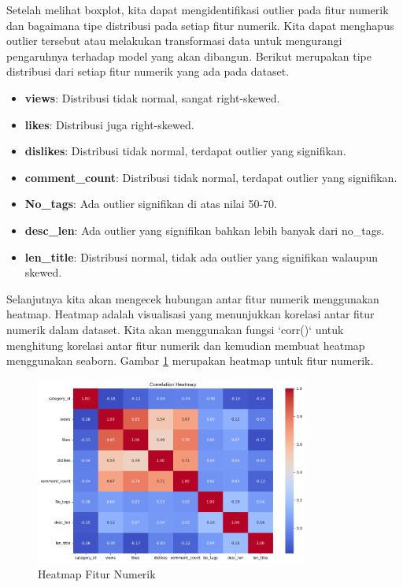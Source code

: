 Setelah melihat boxplot, kita dapat mengidentifikasi outlier pada fitur numerik dan bagaimana tipe distribusi pada setiap fitur numerik. Kita dapat menghapus outlier tersebut atau melakukan transformasi data untuk mengurangi pengaruhnya terhadap model yang akan dibangun. Berikut merupakan tipe distribusi dari setiap fitur numerik yang ada pada dataset.

\begin{itemize}
    \item \textbf{views}: Distribusi tidak normal, sangat right-skewed.
    \item \textbf{likes}: Distribusi juga right-skewed.
    \item \textbf{dislikes}: Distribusi tidak normal, terdapat outlier yang signifikan.
    \item \textbf{comment\_count}: Distribusi tidak normal, terdapat outlier yang signifikan.
    \item \textbf{No\_tags}: Ada outlier signifikan di atas nilai 50-70.
    \item \textbf{desc\_len}: Ada outlier yang signifikan bahkan lebih banyak dari no\_tags.
    \item \textbf{len\_title}: Distribusi normal, tidak ada outlier yang signifikan walaupun skewed.
\end{itemize}

Selanjutnya kita akan mengecek hubungan antar fitur numerik menggunakan heatmap. Heatmap adalah visualisasi yang menunjukkan korelasi antar fitur numerik dalam dataset. Kita akan menggunakan fungsi `corr()` untuk menghitung korelasi antar fitur numerik dan kemudian membuat heatmap menggunakan seaborn. Gambar \ref{fig:heatmap_fitur_numerik} merupakan heatmap untuk fitur numerik.

\begin{figure}[ht]
    \centering
    \includegraphics[width=0.8\textwidth]{gambar/heatmap.png}
    \caption{Heatmap Fitur Numerik}
    \label{fig:heatmap_fitur_numerik}
\end{figure}


